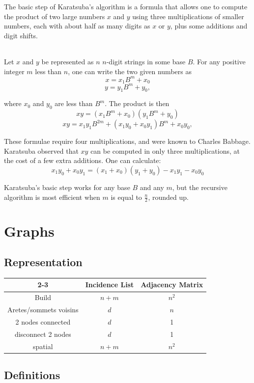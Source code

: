 \documentclass[a4paper, 12pt]{article}
\begin{document}
The basic step of Karatsuba's algorithm is a formula that allows one to compute the product of two large numbers $x$ and $y$ using three multiplications of smaller numbers, each with about half as many digits as $x$ or $y$, plus some additions and digit shifts.

~\\
Let $x$ and $y$ be represented as $n$ $n$-digit strings in some base $B$. For any positive integer $m$ less than $n$, one can write the two given numbers as
$$x = x_{1}B^{m}+x_{0}$$
$$y = y_{1}B^{m}+y_{0},$$

where $x_{0}$ and $y_{0}$ are less than $B^{m}$. The product is then
$$xy=(x_{1}B^{m}+x_{0})(y_{1}B^{m}+y_{0})$$
$$xy=x_{1}y_{1}B^{2m}+(x_{1}y_{0}+x_{0}y_{1})B^{m}+x_{0}y_{0},$$

These formulae require four multiplications, and were known to Charles Babbage. Karatsuba observed that $xy$ can be computed in only three multiplications, at the cost of a few extra additions. One can calculate:
$$x_{1}y_{0}+x_{0}y_{1}=(x_{1}+x_{0})(y_{1}+y_{0})-x_{1}y_{1}-x_{0}y_{0}$$

Karatsuba's basic step works for any base $B$ and any $m$, but the recursive algorithm is most efficient when $m$ is equal to $\frac{n}{2}$, rounded up.

\section{Graphs}

  \subsection{Representation}

\begin{center}
\begin{tabular}{| c | c | c |}
\cline{2-3}
\multicolumn{1}{c |}{} & Incidence List & Adjacency Matrix \\
\hline
Build & $n+m$ & $n^2$ \\
\hline
Aretes/sommets voisins & $d$ & $n$ \\
\hline
2 nodes connected & $d$ & 1 \\
\hline
disconnect 2 nodes & $d$ & 1 \\
\hline
spatial & $n+m$ & $n^2$ \\
\hline
\end{tabular}
\end{center}

  \subsection{Definitions}
\end{document}

